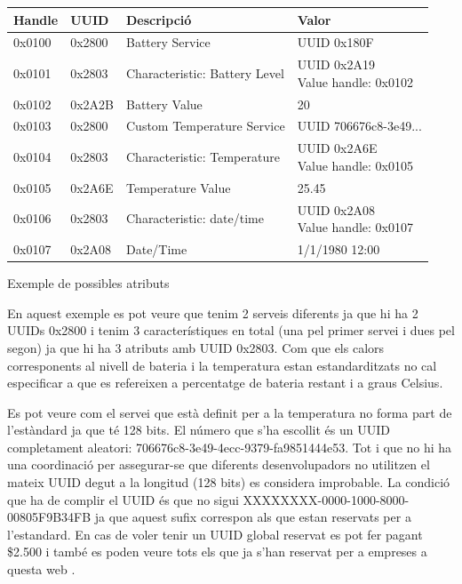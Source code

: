 \begin{center}
	\begin{tabular}{|l|l|l|l|}
		\hline
		Handle	&	UUID	&	Descripció						&	Valor		\\ 	\hline
		0x0100	&	0x2800	&	Battery Service					&	UUID 0x180F	\\		\hline
		0x0101	&	0x2803	&	Characteristic: Battery Level	&	\parbox[t]{4cm}{UUID 0x2A19	\\ Value handle: 0x0102}	\\	\hline
		0x0102	&	0x2A2B	&	Battery Value					&	20	\\	\hline
		0x0103	&	0x2800	&	Custom Temperature Service		&	UUID 	706676c8-3e49...	\\	\hline
		0x0104	&	0x2803	&	Characteristic: Temperature		&	\parbox[t]{4cm}{UUID 0x2A6E	\\ Value handle: 0x0105}	\\		\hline
		0x0105	&	0x2A6E	&	Temperature Value				&	25.45	\\	\hline
		0x0106	&	0x2803	&	Characteristic: date/time		&	\parbox[t]{4cm}{UUID 0x2A08	\\ Value handle: 0x0107}	\\		\hline
		0x0107	&	0x2A08	&	Date/Time						&	1/1/1980 12:00	\\
		\hline
	\end{tabular}

Exemple de possibles atributs
\end{center}

En aquest exemple es pot veure que tenim 2 serveis diferents ja que hi ha 2 UUIDs 0x2800 i tenim 3 característiques en total (una pel primer servei i dues pel segon) ja que hi ha 3 atributs amb UUID 0x2803.
Com que els calors corresponents al nivell de bateria i la temperatura estan estandarditzats no cal especificar a que es refereixen a percentatge de bateria restant i a graus Celsius.

Es pot veure com el servei que està definit per a la temperatura no forma part de l'estàndard ja que té 128 bits. El número que s'ha escollit és un UUID completament aleatori: 706676c8-3e49-4ecc-9379-fa9851444e53. Tot i que no hi ha una coordinació per assegurar-se que diferents desenvolupadors no utilitzen el mateix UUID degut a la longitud (128 bits) es considera improbable. La condició que ha de complir el UUID és que no sigui XXXXXXXX-0000-1000-8000-00805F9B34FB ja que aquest sufix correspon als que estan reservats per a l'estandard. En cas de voler tenir un UUID global reservat es pot fer pagant \$2.500 i també es poden veure tots els que ja s'han reservat per a empreses a questa web \cite{reservedUUIDs}.

